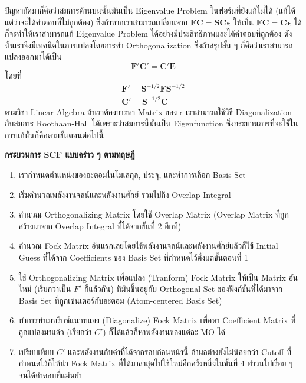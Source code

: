 ปัญหาถัดมาก็คือว่าสมการด้านบนนั้นมันเป็น Eigenvalue Problem ในฟอร์มที่ยังแก้ไม่ได้ (แก้ได้แต่ว่าจะได้คำตอบที่ไม่ถูกต้อง) ซึ่งถ้าหากเราสามารถเปลี่ยนจาก $\bm{FC} = \bm{SC \epsilon}$ ให้เป็น $\bm{FC} = \bm{C \epsilon}$ ได้ ก็จะทำให้เราสามารถแก้ Eigenvalue Problem ได้อย่างมีประสิทธิภาพและได้คำตอบที่ถูกต้อง ดังนั้นเราจึงมีเทคนิคในการแปลงโดยการทำ Orthogonalization ซึ่งถ้าสรุปสั้น ๆ ก็คือว่าเราสามารถ%
แปลงออกมาได้เป็น
%
\begin{equation}
  \bm{F'C'} 
  = 
  \bm{C'E}
\end{equation}
%
โดยที่
%
\begin{gather}
  \bm{F'} = \bm{S}^{-1/2}\bm{F}\bm{S}^{-1/2} \\
  \bm{C'} = \bm{S}^{-1/2}\boldsymbol{C}
\end{gather}
%
ตามวิชา Linear Algebra ถ้าเราต้องการหา Matrix ของ $\epsilon$ เราสามารถใช้วิธี Diagonalization กับสมการ Roothaan-Hall ได้เพราะว่าสมการนี้มันเป็น Eigenfunction ซึ่งกระบวนการที่จะใช้ในการแก้นั้นก็คือตามขั้นตอนต่อไปนี้

\noindent \textbf{กระบวนการ SCF แบบคร่าว ๆ ตามทฤษฎี}

\begin{enumerate}[topsep=0pt,noitemsep]
  \setlength\itemsep{0.5em}
  \item เรากำหนดตำแหน่งของอะตอมในโมเลกุล, ประจุ, และทำการเลือก Basis Set

  \item เริ่มคำนวณพลังงานจลน์และพลังงานศักย์ รวมไปถึง Overlap Integral

  \item คำนวณ Orthogonalizing Matrix โดยใช้ Overlap Matrix (Overlap Matrix ที่ถูกสร้างมาจาก Overlap Integral ที่ได้จากขั้นที่ 2 อีกที)

  \item คำนวณ Fock Matrix อันแรกเลยโดยใช้พลังงานจลน์และพลังงานศักย์แล้วก็ใช้ Initial Guess ที่ได้จาก Coefficients ของ Basis Set ที่กำหนดไว้ตั้งแต่ขั้นตอนที่ 1

  \item ใช้ Orthogonalizing Matrix เพื่อแปลง (Tranform) Fock Matrix ให้เป็น Matrix อันใหม่ (เรียกว่าเป็น $F'$ ก็แล้วกัน) ที่มันขึ้นอยู่กับ Orthogonal Set ของฟังก์ชันที่ได้มาจาก Basis Set ที่ถูกเซนเตอร์กับอะตอม (Atom-centered Basis Set)

  \item ทำการทำเมทริกซ์แนวทแยง (Diagonalize) Fock Matrix เพื่อหา Coefficient Matrix ที่ถูกแปลงมาแล้ว (เรียกว่า $C'$) ก็ได้แล้วก็หาพลังงานของแต่ละ MO ได้

  \item เปรียบเทียบ $C'$ และพลังงานกับค่าที่ได้จากรอบก่อนหน้านี้ ถ้าผลต่างยังไม่น้อยกว่า Cutoff ที่กำหนดไว้ก็ให้นำ Fock Matrix ที่ได้มาล่าสุดไปใช้ใหม่อีกครั้งหนึ่งในขั้นที่ 4 ทำวนไปเรื่อย ๆ จนได้คำตอบที่แม่นยำ
\end{enumerate}

